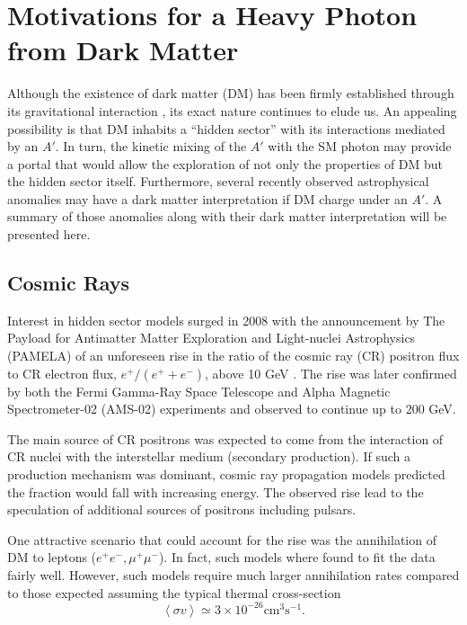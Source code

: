 \section{Motivations for a Heavy Photon from Dark Matter}

Although the existence of dark matter (DM) has been firmly established through its
gravitational interaction \cite{popolo2014}, its exact nature continues to elude
us. An appealing
possibility is that DM inhabits a ``hidden sector'' with its interactions 
mediated by an $A'$.  In turn, the kinetic mixing of the $A'$ with the SM 
photon may provide a portal that would allow the exploration of not only the 
properties of DM but the hidden sector itself.  Furthermore, several recently
observed astrophysical anomalies \cite{pamela2008, ackermann2012, aguilar2013, 
hooper2011, linden2011, abazajian2012, hooper2013, Bulbul:2014sua}
may have a dark matter interpretation if DM
charge under an $A'$.  A summary of those anomalies along with their dark matter
interpretation will be presented here.

\subsection{Cosmic Rays}

Interest in hidden sector models surged in 2008 with the announcement by 
The Payload for Antimatter Matter Exploration and Light-nuclei Astrophysics \\ 
(PAMELA) of an unforeseen rise in the ratio of the cosmic ray (CR) positron flux
to CR electron flux, $e^{+}/(e^{+} + e^{-})$, above 10 GeV \cite{pamela2008}.
The rise was later confirmed by both the 
Fermi Gamma-Ray Space Telescope \cite{ackermann2012} and Alpha Magnetic 
Spectrometer-02 (AMS-02) \cite{aguilar2013} experiments and observed to continue
up to 200 GeV. 

The main source of CR positrons 
was expected to come from the interaction of CR nuclei with the interstellar 
medium (secondary production).  If such a production mechanism was dominant, 
cosmic ray propagation models predicted the fraction would fall with increasing
energy.  The observed rise lead to the speculation of additional sources of 
positrons including pulsars\cite{yin2013, linden2013}.

One attractive scenario that could account for the rise was the annihilation of
DM to leptons ($e^+e^-, \mu^+\mu^-$). In fact, such models where found to fit 
the data fairly well.  However, such models require much 
larger annihilation rates compared to those expected assuming the typical 
thermal cross-section \cite{Cholis:2008hb}
\begin{equation}
    \left \langle \sigma v \right \rangle \simeq 3 \times 10^{-26} \text{cm}^3 \text{s}^{-1}.
\end{equation}


